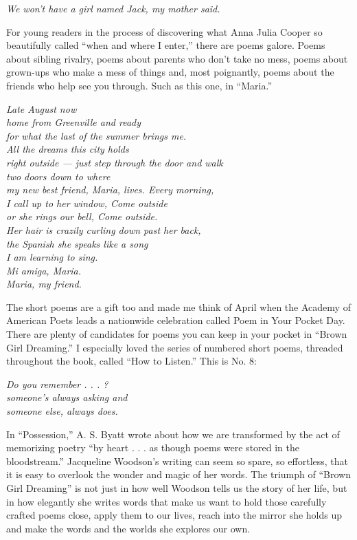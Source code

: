 \emph{We won't have a girl named Jack, my mother said.}

For young readers in the process of discovering what Anna Julia Cooper
so beautifully called ``when and where I ­enter,'' there are poems
galore. Poems about sibling rivalry, poems about parents who don't take
no mess, poems about grown-ups who make a mess of things and, most
poignantly, poems about the friends who help see you through. Such as
this one, in ``Maria.''

\emph{Late August now}\\
\emph{home from Greenville and ready}\\
\emph{for what the last of the summer brings me.}\\
\emph{All the dreams this city holds}\\
\emph{right outside --- just step through the door and walk}\\
\emph{two doors down to where}\\
\emph{my new best friend, Maria, lives. Every morning,}\\
\emph{I call up to her window, Come outside}\\
\emph{or she rings our bell, Come outside.}\\
\emph{Her hair is crazily curling down past her back,}\\
\emph{the Spanish she speaks like a song}\\
\emph{I am learning to sing.}\\
\emph{Mi amiga, Maria.}\\
\emph{Maria, my friend.}

The short poems are a gift too and made me think of April when the
Academy of American Poets leads a nationwide celebration called Poem in
Your Pocket Day. There are plenty of candidates for poems you can keep
in your pocket in ``Brown Girl Dreaming.'' I especially loved the series
of numbered short poems, threaded throughout the book, called ``How to
Listen.'' This is No. 8:

\emph{Do you remember . . . ?}\\
\emph{someone's always asking and}\\
\emph{someone else, always does.}

In ``Possession,'' A. S. Byatt wrote about how we are transformed by the
act of memorizing poetry ``by heart . . . as though poems were stored in
the bloodstream.'' Jacqueline Woodson's writing can seem so spare, so
effortless, that it is easy to overlook the wonder and magic of her
words. The triumph of ``Brown Girl Dreaming'' is not just in how well
Woodson tells us the story of her life, but in how elegantly she writes
words that make us want to hold those carefully crafted poems close,
apply them to our lives, reach into the mirror she holds up and make the
words and the worlds she explores our own.

